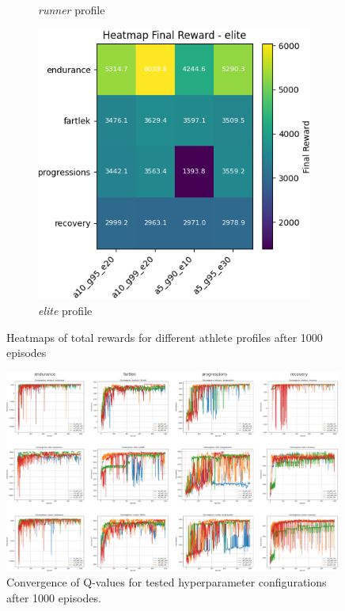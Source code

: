 \begin{figure}
\begin{subfigure}[t]{0.32\textwidth}
        \caption{\textit{runner} profile }
    \label{fig:runner-1000}
    \end{subfigure}
    \begin{subfigure}[t]{0.32\textwidth}
        \centering
        \includegraphics[width=\textwidth]{images/heatmap_final_elite_1000.png}
        \caption{\textit{elite} profile }
    \label{fig:elite-1000}
    \end{subfigure}
    \caption{Heatmaps of total rewards for different athlete profiles after 1000 episodes}
\end{figure}

\begin{figure}[t]
    \centering
    \includegraphics[width=0.99\textwidth]{images/convergence_grid_1000_custom.png}
    \caption{Convergence of Q-values for tested hyperparameter configurations after 1000 episodes.}
    \label{fig:convergence-1000}
\end{figure}

